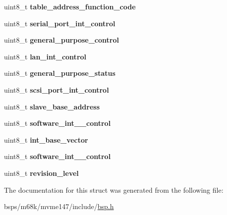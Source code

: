 \begin{DoxyCompactItemize}
uint8\+\_\+t {\bfseries table\+\_\+address\+\_\+function\+\_\+code}
\item 
\mbox{\label{structpcc__map_a81b2e0196fa53d5dd6bc272ce775f89b}} 
uint8\+\_\+t {\bfseries serial\+\_\+port\+\_\+int\+\_\+control}
\item 
\mbox{\label{structpcc__map_aa3abfa724733021fe076c7433af3697a}} 
uint8\+\_\+t {\bfseries general\+\_\+purpose\+\_\+control}
\item 
\mbox{\label{structpcc__map_a6d4cdb4b5c94777f0de6456e992f4dd7}} 
uint8\+\_\+t {\bfseries lan\+\_\+int\+\_\+control}
\item 
\mbox{\label{structpcc__map_a9ef818e0fee868b9101c26e1c42d3d24}} 
uint8\+\_\+t {\bfseries general\+\_\+purpose\+\_\+status}
\item 
\mbox{\label{structpcc__map_a4004944b2bdf6921ef5c4ffe137d068e}} 
uint8\+\_\+t {\bfseries scsi\+\_\+port\+\_\+int\+\_\+control}
\item 
\mbox{\label{structpcc__map_a94dd0624e4af96e8e6ee7e778b6561c5}} 
uint8\+\_\+t {\bfseries slave\+\_\+base\+\_\+address}
\item 
\mbox{\label{structpcc__map_a1b8a253465ebded9b2bad4a1266b53ff}} 
uint8\+\_\+t {\bfseries software\+\_\+int\+\_\+\_\+control}
\item 
\mbox{\label{structpcc__map_ae3722785d53bff982f0c77d780351d82}} 
uint8\+\_\+t {\bfseries int\+\_\+base\+\_\+vector}
\item 
\mbox{\label{structpcc__map_a1ce6f2b98b2dd4bc217ec57eae6763f2}} 
uint8\+\_\+t {\bfseries software\+\_\+int\+\_\+\_\+control}
\item 
\mbox{\label{structpcc__map_a472231d3f383686cb2eaa9d4ff686338}} 
uint8\+\_\+t {\bfseries revision\+\_\+level}
\end{DoxyCompactItemize}


The documentation for this struct was generated from the following file\+:\begin{DoxyCompactItemize}
\item 
bsps/m68k/mvme147/include/\mbox{\hyperlink{bsps_2m68k_2mvme147_2include_2bsp_8h}{bsp.\+h}}\end{DoxyCompactItemize}
